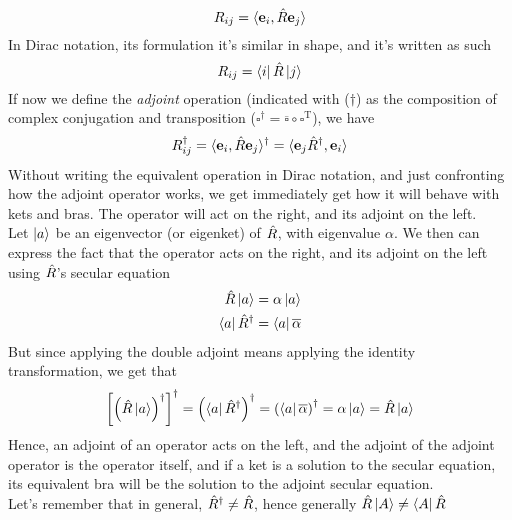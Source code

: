 \documentclass[../qm.tex]{subfiles}
\begin{document}
	\begin{equation*}
		R_{ij}=\langle\mathbf{e}_i,\hat{R}\mathbf{e}_j\rangle
	\end{equation*}
	In Dirac notation, its formulation it's similar in shape, and it's written as such
	\begin{equation*}
		R_{ij}=\bra{i}\hat{R}\ket{j}
	\end{equation*}
	If now we define the \textit{adjoint} operation (indicated with ($\dagger$) as the composition of complex conjugation and transposition ($\square^{\dagger}=\overline{\square}\circ\square^{\text{T}}$), we have
	\begin{equation*}
		R_{ij}^{\dagger}=\langle\mathbf{e}_i,\hat{R}\mathbf{e}_j\rangle^{\dagger}=\langle\mathbf{e}_j\hat{R}^{\dagger},\mathbf{e}_i\rangle
	\end{equation*}
	Without writing the equivalent operation in Dirac notation, and just confronting how the adjoint operator works, we get immediately get how it will behave with kets and bras. The operator will act on the right, and its adjoint on the left.\\
	Let $\ket{a}$ be an eigenvector (or eigenket) of $\hat{R}$, with eigenvalue $\alpha$. We then can express the fact that the operator acts on the right, and its adjoint on the left using $\hat{R}$'s secular equation
	\begin{equation*}
		\begin{aligned}
			\hat{R}\ket{a}&=\alpha\ket{a}\\
			\bra{a}\hat{R}^{\dagger}&=\bra{a}\overline{\alpha}
		\end{aligned}
	\end{equation*}
	But since applying the double adjoint means applying the identity transformation, we get that
	\begin{equation*}
		\left[\left( \hat{R}\ket{a} \right)^{\dagger}\right]^{\dagger}=\left(\bra{a}\hat{R}^{\dagger}\right)^{\dagger}=\left(\bra{a}\overline{\alpha}\right)^{\dagger}=\alpha\ket{a}=\hat{R}\ket{a}
	\end{equation*}
	Hence, an adjoint of an operator acts on the left, and the adjoint of the adjoint operator is the operator itself, and if a ket is a solution to the secular equation, its equivalent bra will be the solution to the adjoint secular equation.\\
	Let's remember that in general, $\hat{R}^{\dagger}\ne\hat{R}$, hence generally $\hat{R}\ket{A}\ne\bra{A}\hat{R}$
\end{document}
